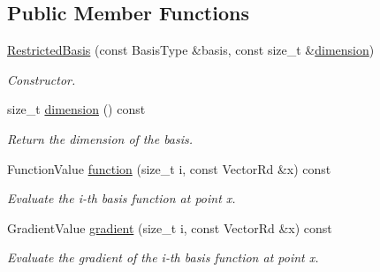 \subsection*{Public Member Functions}
\begin{DoxyCompactItemize}
\item 
\hyperlink{classHArDCore3D_1_1RestrictedBasis_ac9623c0deb32ee33cb10de45f4f75702}{Restricted\+Basis} (const Basis\+Type \&basis, const size\+\_\+t \&\hyperlink{classHArDCore3D_1_1RestrictedBasis_af281956665b32bc8613043e4f303182e}{dimension})
\begin{DoxyCompactList}\small\item\em Constructor. \end{DoxyCompactList}\item 
\mbox{\label{classHArDCore3D_1_1RestrictedBasis_af281956665b32bc8613043e4f303182e}} 
size\+\_\+t \hyperlink{classHArDCore3D_1_1RestrictedBasis_af281956665b32bc8613043e4f303182e}{dimension} () const
\begin{DoxyCompactList}\small\item\em Return the dimension of the basis. \end{DoxyCompactList}\item 
\mbox{\label{classHArDCore3D_1_1RestrictedBasis_acb26aa08f1f3d62deb174e82dc9c2046}} 
Function\+Value \hyperlink{classHArDCore3D_1_1RestrictedBasis_acb26aa08f1f3d62deb174e82dc9c2046}{function} (size\+\_\+t i, const Vector\+Rd \&x) const
\begin{DoxyCompactList}\small\item\em Evaluate the i-\/th basis function at point x. \end{DoxyCompactList}\item 
\mbox{\label{classHArDCore3D_1_1RestrictedBasis_ae191627737010694521dc5aae42744cd}} 
Gradient\+Value \hyperlink{classHArDCore3D_1_1RestrictedBasis_ae191627737010694521dc5aae42744cd}{gradient} (size\+\_\+t i, const Vector\+Rd \&x) const
\begin{DoxyCompactList}\small\item\em Evaluate the gradient of the i-\/th basis function at point x. \end{DoxyCompactList}\item 
\mbox{\label{classHArDCore3D_1_1RestrictedBasis_a6886d8130d38f8e0cdeac3c53fe9e177}} 

\end{DoxyCompactItemize}
